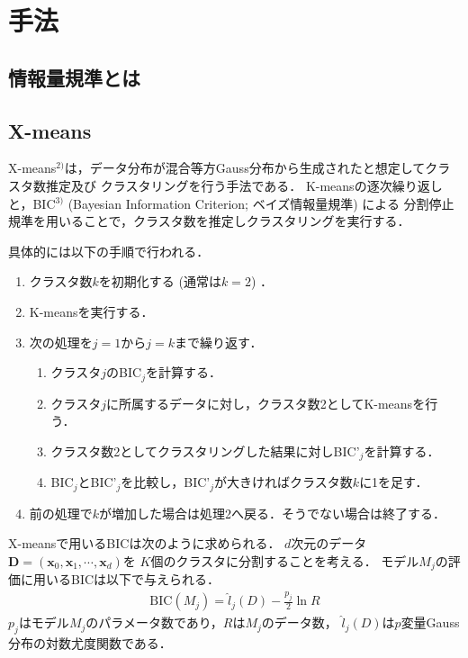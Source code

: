 \section{手法}
\subsection{情報量規準とは}
\subsection{X-means}
X-means$^{2)}$は，データ分布が混合等方Gauss分布から生成されたと想定してクラスタ数推定及び
クラスタリングを行う手法である．
K-meansの逐次繰り返しと，BIC$^{3)}$ (Bayesian Information Criterion; ベイズ情報量規準) による
分割停止規準を用いることで，クラスタ数を推定しクラスタリングを実行する．

具体的には以下の手順で行われる．
\begin{enumerate}
    \item クラスタ数$k$を初期化する (通常は$k=2$) ．
    \item K-meansを実行する．
    \item 次の処理を$j=1$から$j=k$まで繰り返す．
    \begin{enumerate}
        \item クラスタ$j$のBIC$_j$を計算する．
        \item クラスタ$j$に所属するデータに対し，クラスタ数2としてK-meansを行う．
        \item クラスタ数2としてクラスタリングした結果に対しBIC'$_j$を計算する．
        \item BIC$_j$とBIC'$_j$を比較し，BIC'$_j$が大きければクラスタ数$k$に1を足す．
    \end{enumerate}
    \item 前の処理で$k$が増加した場合は処理2へ戻る．そうでない場合は終了する．
\end{enumerate}

X-meansで用いるBICは次のように求められる．
$d$次元のデータ${\bm D}=({\bm x_0}, {\bm x_1}, \cdots, {\bm x_d})$を
$K$個のクラスタに分割することを考える．
モデル$M_j$の評価に用いるBICは以下で与えられる．
\begin{align}
  \label{eq:bic}
  \mathrm{BIC}(M_j) = \hat{l}_j(D) - \frac{p_j}{2}\ln R
\end{align}
$p_j$はモデル$M_j$のパラメータ数であり，$R$は$M_j$のデータ数，
$\hat{l}_j(D)$は$p$変量Gauss分布の対数尤度関数である．

